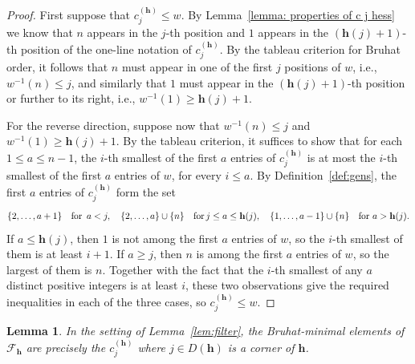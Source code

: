 \documentclass[11pt]{amsart}
\theoremstyle{plain}
\newtheorem{lem}[thm]{Lemma}
\theoremstyle{definition}
\newcommand{\hess}{{\mathbf h}}
\numberwithin{equation}{section}
\begin{document}
\begin{proof} 
First suppose that $c_j^{(\hess)} \leq w$. By Lemma~\ref{lemma: properties of c j hess} we know that $n$ appears in the $j$-th position and $1$ appears in the $(\hess(j)+1)$-th position of the one-line notation of $c_j^{(\hess)}$. By the tableau criterion for Bruhat order, it follows that $n$ must appear in one of the first $j$ positions of $w$, i.e., $w^{-1}(n) \leq j$, and similarly that $1$ must appear in the $(\hess(j)+1)$-th position or further to its right, i.e., $w^{-1}(1) \geq \hess(j)+1$. 


For the reverse direction, suppose now that $w^{-1}(n) \leq j$ and $w^{-1}(1)\geq \hess(j)+1$. By the tableau criterion, it suffices to show that for each $1\leq a\leq n-1$, the $i$-th smallest of the first $a$ entries of $c_j^{(\hess)}$ is at most the $i$-th smallest of the first $a$ entries of $w$, for every $i\leq a$. By Definition~\ref{def:gens}, the first $a$ entries of $c_j^{(\hess)}$ form the set
\[
\{2,\ldots,a+1\}\ \ \textup{ for } \, a<j,\quad
\{2,\ldots,a\}\cup\{n\}\ \ \textup{ for} \, j\leq a\leq\hess(j),\quad
\{1,\ldots,a-1\}\cup\{n\}\ \ \textup{ for } a>\hess(j).
\]
If $a\leq\hess(j)$, then $1$ is not among the first $a$ entries of $w$, so the $i$-th smallest of them is at least $i+1$. If $a\geq j$, then $n$ is among the first $a$ entries of $w$, so the largest of them is $n$. Together with the fact that the $i$-th smallest of any $a$ distinct positive integers is at least $i$, these two observations give the required inequalities in each of the three cases, so $c_j^{(\hess)} \leq w$.
\end{proof} 



\begin{lem}\label{lem:minimal-jumps}
In the setting of Lemma~\ref{lem:filter}, the Bruhat-minimal elements of $\mathcal{F}_\hess$ are precisely the $c_j^{(\hess)}$ where $j \in D(\hess)$ is a corner of $\hess$.
\end{lem}
\end{document}
